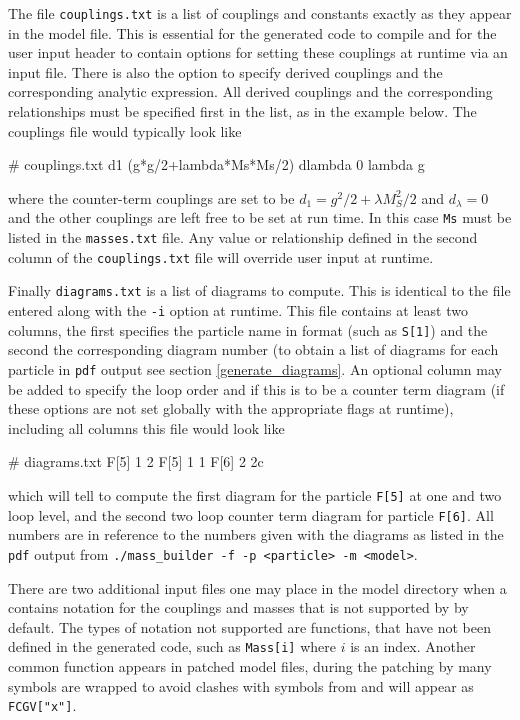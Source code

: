 The file \lstinline{couplings.txt} is a list of couplings and constants exactly as they appear in the \feynarts model file.  This is essential for the generated code to compile and for the user input header to contain options for setting these couplings at runtime via an input file.  There is also the option to specify derived couplings and the corresponding analytic expression.  All derived couplings and the corresponding relationships must be specified first in the list, as in the example below.  The couplings file would typically look like
\begin{lstterm}
# couplings.txt
d1 (g*g/2+lambda*Ms*Ms/2)
dlambda 0
lambda
g
\end{lstterm}
where the counter-term couplings are set to be $d_1=g^2/2 + \lambda M_S^2/2$ and $d_{\lambda}=0$ and the other couplings are left free to be set at run time.  In this case \lstinline{Ms} must be listed in the \lstinline{masses.txt} file.  Any value or relationship defined in the second column of the \lstinline{couplings.txt} file will override user input at runtime.

Finally \lstinline{diagrams.txt} is a list of diagrams to compute.  This is identical to the file entered along with the \lstinline{-i} option at runtime.  This file contains at least two columns, the first specifies the particle name in \feynarts format (such as \lstinline{S[1]}) and the second the corresponding diagram number (to obtain a list of diagrams for each particle in \lstinline{pdf} output see section \ref{generate_diagrams}.  An optional column may be added to specify the loop order and if this is to be a counter term diagram (if these options are not set globally with the appropriate flags at runtime), including all columns this file would look like
\begin{lstterm}
# diagrams.txt
F[5]   1   2
F[5]   1   1
F[6]   2   2c
\end{lstterm}
which will tell \mb to compute the first diagram for the particle \lstinline{F[5]} at one and two loop level, and the second two loop counter term diagram for particle \lstinline{F[6]}.  All numbers are in reference to the numbers given with the diagrams as listed in the \lstinline{pdf} output from \lstinline{./mass_builder -f -p <particle> -m <model>}.

There are two additional input files one may place in the model directory when a \feynarts contains notation for the couplings and masses that is not supported by \mb by default.  The types of notation not supported are functions, that have not been defined in the generated code, such as \lstinline{Mass[i]} where $i$ is an index.  Another common function appears in patched \feynarts model files, during the patching by \feyncalc many symbols are wrapped to avoid clashes with symbols from \feyncalc and will appear as \lstinline{FCGV["x"]}.  


